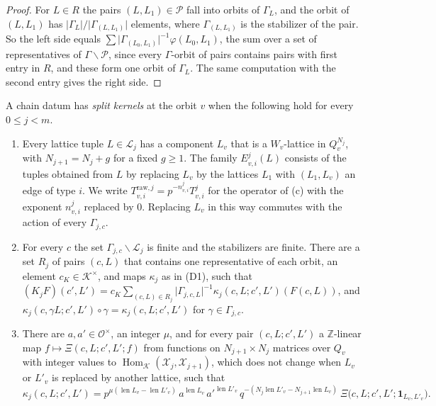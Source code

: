 \begin{proof}
For $L\in R$ the pairs $(L,L_1)\in\mathcal P$ fall into orbits of $\Gamma_L$, and the orbit of $(L,L_1)$ has $\lvert\Gamma_L\rvert/\lvert\Gamma_{(L,L_1)}\rvert$ elements, where $\Gamma_{(L,L_1)}$ is the stabilizer of the pair. So the left side equals $\sum\lvert\Gamma_{(L_0,L_1)}\rvert^{-1}\varphi(L_0,L_1)$, the sum over a set of representatives of $\Gamma\backslash\mathcal P$, since every $\Gamma$-orbit of pairs contains pairs with first entry in $R$, and these form one orbit of $\Gamma_L$. The same computation with the second entry gives the right side.
\end{proof}

\begin{definition}\label{splitkernel}
A chain datum has \emph{split kernels} at the orbit $v$ when the following hold for every $0\le j<m$.
\begin{enumerate}
\item[(S1)] Every lattice tuple $L\in\mathcal L_j$ has a component $L_v$ that is a $W_v$-lattice in $Q_v^{N_j}$, with $N_{j+1}=N_j+g$ for a fixed $g\ge1$. The family $E^j_{v,i}(L)$ consists of the tuples obtained from $L$ by replacing $L_v$ by the lattices $L_1$ with $(L_1,L_v)$ an edge of type $i$. We write $T^{\mathrm{raw},j}_{v,i}=p^{-n^j_{v,i}}T^j_{v,i}$ for the operator of (c) with the exponent $n^j_{v,i}$ replaced by $0$. Replacing $L_v$ in this way commutes with the action of every $\Gamma_{j,c}$.
\item[(S2)] For every $c$ the set $\Gamma_{j,c}\backslash\mathcal L_j$ is finite and the stabilizers are finite. There are a set $R_j$ of pairs $(c,L)$ that contains one representative of each orbit, an element $c_K\in\mathcal K^\times$, and maps $\kappa_j$ as in (D1), such that $(K_jF)(c',L')=c_K\sum_{(c,L)\in R_j}\lvert\Gamma_{j,c,L}\rvert^{-1}\kappa_j(c,L;c',L')(F(c,L))$, and $\kappa_j(c,\gamma L;c',L')\circ\gamma=\kappa_j(c,L;c',L')$ for $\gamma\in\Gamma_{j,c}$.
\item[(S3)] There are $a,a'\in\mathcal O^\times$, an integer $\mu$, and for every pair $(c,L;c',L')$ a $\mathbb Z$-linear map $f\mapsto\Xi(c,L;c',L';f)$ from functions on $N_{j+1}\times N_j$ matrices over $Q_v$ with integer values to $\operatorname{Hom}_{\mathcal K}(\mathcal X_j,\mathcal X_{j+1})$, which does not change when $L_v$ or $L'_v$ is replaced by another lattice, such that
\[
\kappa_j(c,L;c',L')=p^{\mu(\operatorname{len}L_v-\operatorname{len}L'_v)}\,a^{\operatorname{len}L_v}\,a'^{\operatorname{len}L'_v}\,q^{-(N_j\operatorname{len}L'_v-N_{j+1}\operatorname{len}L_v)}\ \Xi\big(c,L;c',L';\mathbf 1_{L_v,L'_v}\big).
\]
\end{enumerate}
\end{definition}

